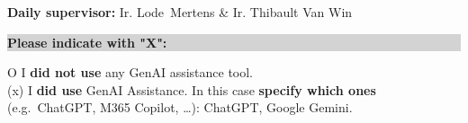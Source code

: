 \vspace{1em}

\textbf{Daily supervisor:} Ir. Lode~Mertens \& Ir. Thibault Van Win

\vspace{2em}

\noindent
\colorbox{lightgray}{\parbox{\dimexpr\linewidth-2\fboxsep\relax}{\textbf{Please indicate with "X":}}}

\vspace{1em}

O I \textbf{did not use} any GenAI assistance tool. \\[1em]

(x) I \textbf{did use} GenAI Assistance. In this case \textbf{specify which ones} (e.g.\ ChatGPT, M365 Copilot, …): ChatGPT, Google Gemini.

\newpage



\newcommand{\Cell}[1]{\begin{minipage}[t]{\linewidth}\raggedright\small #1\end{minipage}}

\setlength{\tabcolsep}{6pt}
\renewcommand{\arraystretch}{1.2}

